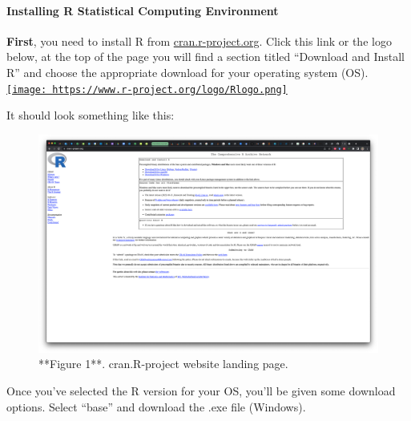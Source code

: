 \documentclass[
]{article}
\begin{document}
\hypertarget{installing-r-statistical-computing-environment}{%
\paragraph{Installing R Statistical Computing
Environment}\label{installing-r-statistical-computing-environment}}

\hfill\break

\textbf{First}, you need to install R from
\href{https://cran.r-project.org/}{cran.r-project.org}. Click this link
or the logo below, at the top of the page you will find a section titled
``Download and Install R'' and choose the appropriate download for your
operating system (OS).\\

\href{https://cran.r-project.org/}{\texttt{[image: https://www.r-project.org/logo/Rlogo.png]}}

\hfill\break
It should look something like this:

\begin{figure}

{\centering \includegraphics{images/cran_page} 

}

\caption{**Figure 1**. cran.R-project website landing page.}\label{fig:screenshot of R main site}
\end{figure}

\hfill\break

Once you've selected the R version for your OS, you'll be given some
download options. Select ``base'' and download the .exe file (Windows).
\end{document}
